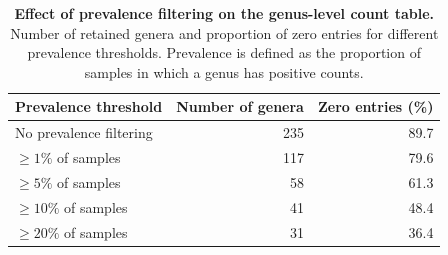 \begin{table}

\caption{\label{tab:unnamed-chunk-10}\textbf{Effect of prevalence filtering on the genus-level count table.} Number of retained genera and proportion of zero entries for different prevalence thresholds. Prevalence is defined as the proportion of samples in which a genus has positive counts.}
\centering
\begin{tabular}[t]{lrr}
\toprule
Prevalence threshold & Number of genera & Zero entries (\%)\\
\midrule
No prevalence filtering & 235 & 89.7\\
$\geq 1\%$ of samples & 117 & 79.6\\
$\geq 5\%$ of samples & 58 & 61.3\\
$\geq 10\%$ of samples & 41 & 48.4\\
$\geq 20\%$ of samples & 31 & 36.4\\
\bottomrule
\end{tabular}
\end{table}
